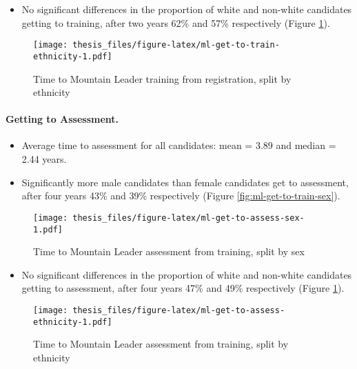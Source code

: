 \documentclass[
  12pt,
  a4paper,
]{book}
\providecommand{\tightlist}{%
  \setlength{\itemsep}{0pt}\setlength{\parskip}{0pt}}
\begin{document}
\begin{itemize}
\tightlist
\item
  No significant differences in the proportion of white and non-white candidates getting to training, after two years 62\% and 57\% respectively (Figure \ref{fig:ml-get-to-train-ethnicity}).
\end{itemize}

\begin{figure}
\centering
\texttt{[image: thesis\_files/figure-latex/ml-get-to-train-ethnicity-1.pdf]}
\caption{\label{fig:ml-get-to-train-ethnicity}Time to Mountain Leader training from registration, split by ethnicity}
\end{figure}

\hypertarget{mts-part-a-getting-to-assessment-ml}{%
\paragraph{Getting to Assessment.}\label{mts-part-a-getting-to-assessment-ml}}

\begin{itemize}
\tightlist
\item
  Average time to assessment for all candidates: mean = 3.89 and median = 2.44 years.
\item
  Significantly more male candidates than female candidates get to assessment, after four years 43\% and 39\% respectively (Figure \ref{fig:ml-get-to-train-sex}).
\end{itemize}

\begin{figure}
\centering
\texttt{[image: thesis\_files/figure-latex/ml-get-to-assess-sex-1.pdf]}
\caption{\label{fig:ml-get-to-assess-sex}Time to Mountain Leader assessment from training, split by sex}
\end{figure}

\begin{itemize}
\tightlist
\item
  No significant differences in the proportion of white and non-white candidates getting to assessment, after four years 47\% and 49\% respectively (Figure \ref{fig:ml-get-to-train-ethnicity}).
\end{itemize}

\begin{figure}
\centering
\texttt{[image: thesis\_files/figure-latex/ml-get-to-assess-ethnicity-1.pdf]}
\caption{\label{fig:ml-get-to-assess-ethnicity}Time to Mountain Leader assessment from training, split by ethnicity}
\end{figure}
\end{document}

